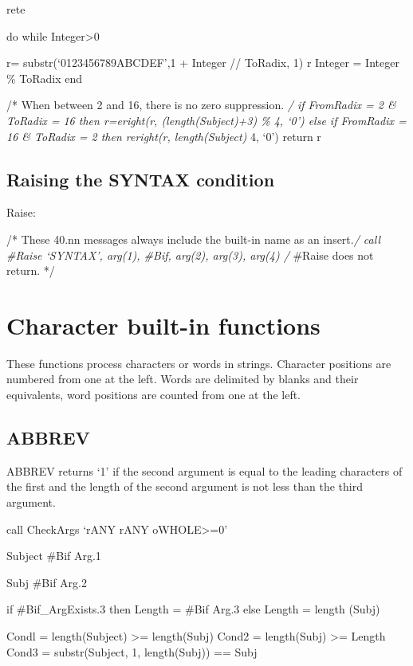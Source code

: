 rete

do while Integer\textgreater0

r= substr(`0123456789ABCDEF',1 + Integer // ToRadix, 1)
\textbar\textbar{} r Integer = Integer \% ToRadix end

/* When between 2 and 16, there is no zero suppression. \emph{/ if
FromRadix = 2 \& ToRadix = 16 then r=eright(r, (length(Subject)+3) \% 4,
`0') else if FromRadix = 16 \& ToRadix = 2 then reright(r,
length(Subject) } 4, `0') return r

\hypertarget{raising-the-syntax-condition}{%
\subsection{Raising the SYNTAX
condition}\label{raising-the-syntax-condition}}

Raise:

/* These 40.nn messages always include the built-in name as an
insert.\emph{/ call \#Raise `SYNTAX', arg(1), \#Bif, arg(2), arg(3),
arg(4) /} \#Raise does not return. */

\hypertarget{character-built-in-functions}{%
\section{Character built-in
functions}\label{character-built-in-functions}}

These functions process characters or words in strings. Character
positions are numbered from one at the left. Words are delimited by
blanks and their equivalents, word positions are counted from one at the
left.

\hypertarget{abbrev}{%
\subsection{ABBREV}\label{abbrev}}

ABBREV returns `1' if the second argument is equal to the leading
characters of the first and the length of the second argument is not
less than the third argument.

call CheckArgs `rANY rANY oWHOLE\textgreater=0'

Subject \#Bif Arg.1

Subj \#Bif Arg.2

if \#Bif\_ArgExists.3 then Length = \#Bif Arg.3 else Length = length
(Subj)

Condl = length(Subject) \textgreater= length(Subj) Cond2 = length(Subj)
\textgreater= Length Cond3 = substr(Subject, 1, length(Subj)) == Subj

